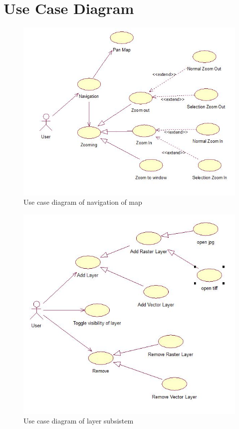 \chapter{Use Case Diagram}
\begin{figure}[h]
\begin{center}
  \includegraphics [scale=0.8] {Navigation.jpg}
  \caption[Use Case - Navigation]{Use case diagram of navigation of map}
\end{center}
\end{figure}
\begin{figure}[h]
\begin{center}
  \includegraphics [scale=0.8] {addremove.jpg}
  \caption[Use Case - Layer]{Use case diagram of layer subsistem}
\end{center}
\end{figure}
